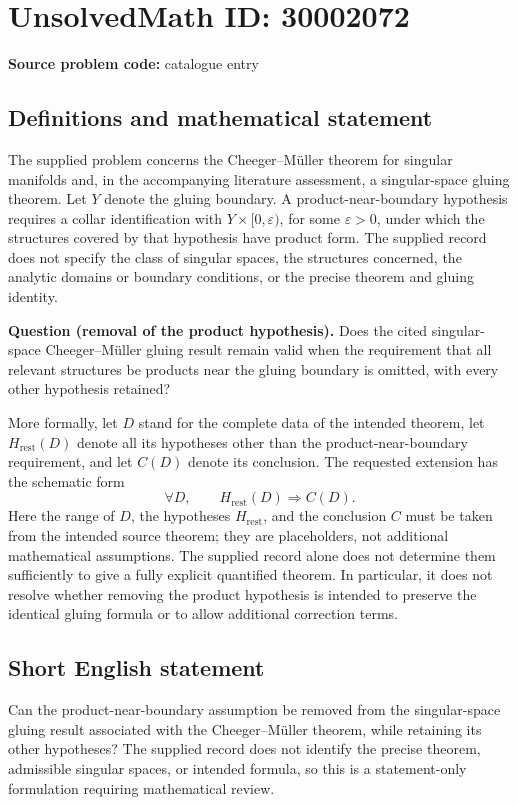 \documentclass[11pt]{article}
\begin{document}
\section*{UnsolvedMath ID: 30002072}
\textbf{Source problem code:} catalogue entry
\subsection{Definitions and mathematical statement}
The supplied problem concerns the Cheeger--Müller theorem for singular manifolds and, in the accompanying literature assessment, a singular-space gluing theorem. Let \(Y\) denote the gluing boundary. A product-near-boundary hypothesis requires a collar identification with \(Y\times[0,\varepsilon)\), for some \(\varepsilon>0\), under which the structures covered by that hypothesis have product form. The supplied record does not specify the class of singular spaces, the structures concerned, the analytic domains or boundary conditions, or the precise theorem and gluing identity.

\textbf{Question (removal of the product hypothesis).} Does the cited singular-space Cheeger--Müller gluing result remain valid when the requirement that all relevant structures be products near the gluing boundary is omitted, with every other hypothesis retained?

More formally, let \(D\) stand for the complete data of the intended theorem, let \(H_{\mathrm{rest}}(D)\) denote all its hypotheses other than the product-near-boundary requirement, and let \(C(D)\) denote its conclusion. The requested extension has the schematic form
\[
\forall D,\qquad H_{\mathrm{rest}}(D)\Longrightarrow C(D).
\]
Here the range of \(D\), the hypotheses \(H_{\mathrm{rest}}\), and the conclusion \(C\) must be taken from the intended source theorem; they are placeholders, not additional mathematical assumptions. The supplied record alone does not determine them sufficiently to give a fully explicit quantified theorem. In particular, it does not resolve whether removing the product hypothesis is intended to preserve the identical gluing formula or to allow additional correction terms.
\subsection{Short English statement}
Can the product-near-boundary assumption be removed from the singular-space gluing result associated with the Cheeger--Müller theorem, while retaining its other hypotheses? The supplied record does not identify the precise theorem, admissible singular spaces, or intended formula, so this is a statement-only formulation requiring mathematical review.
\end{document}
